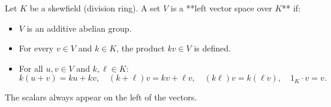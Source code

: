 Let $K$ be a skewfield (division ring). A set $V$ is a **left vector space over $K$** if:
\begin{itemize}
\item $V$ is an additive abelian group.
\item For every $v \in V$ and $k \in K$, the product $kv \in V$ is defined.
\item For all $u, v \in V$ and $k, \ell \in K$:
  $$k(u + v) = ku + kv, \quad (k + \ell)v = kv + \ell v, \quad (k\ell)v = k(\ell v), \quad 1_K \cdot v = v.$$
\end{itemize}
The scalars always appear on the left of the vectors.
